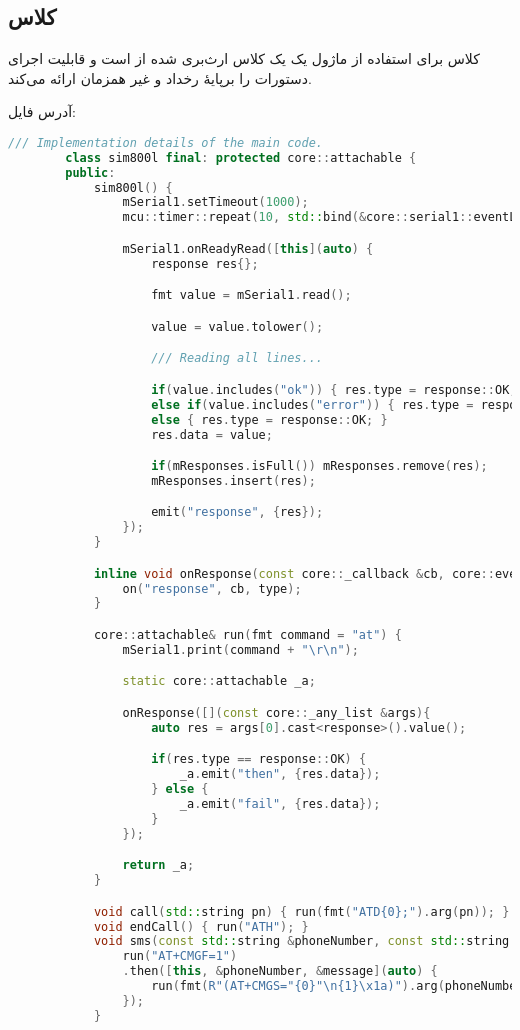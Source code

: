 \subsection{کلاس }
کلاس  برای استفاده از ماژول
یک یک کلاس ارث‌بری شده از  است و قابلیت اجرای دستورات را برپایهٔ رخداد و غیر همزمان ارائه می‌کند.

آدرس فایل:
\hyperref{https://github.com/cardianco/cardian-hardware/blob/master/main/utils/sim800.h}{}{}{}
\begin{latin}
	\small
	\begin{lstlisting}[language=c++, caption={}]
		/// Implementation details of the main code.
		class sim800l final: protected core::attachable {
		public:
			sim800l() {
				mSerial1.setTimeout(1000);
				mcu::timer::repeat(10, std::bind(&core::serial1::eventLoop, &mSerial1));

				mSerial1.onReadyRead([this](auto) {
					response res{};

					fmt value = mSerial1.read();

					value = value.tolower();

					/// Reading all lines...

					if(value.includes("ok")) { res.type = response::OK; }
					else if(value.includes("error")) { res.type = response::ERROR; } else if(value.includes("call ready") || value.includes("sms ready")) { res.type = response::STATUS; }
					else { res.type = response::OK; }
					res.data = value;

					if(mResponses.isFull()) mResponses.remove(res);
					mResponses.insert(res);

					emit("response", {res});
				});
			}

			inline void onResponse(const core::_callback &cb, core::event::Type type = core::event::Once) {
				on("response", cb, type);
			}

			core::attachable& run(fmt command = "at") {
				mSerial1.print(command + "\r\n");

				static core::attachable _a;

				onResponse([](const core::_any_list &args){
					auto res = args[0].cast<response>().value();

					if(res.type == response::OK) {
						_a.emit("then", {res.data});
					} else {
						_a.emit("fail", {res.data});
					}
				});

				return _a;
			}

			void call(std::string pn) { run(fmt("ATD{0};").arg(pn)); }
			void endCall() { run("ATH"); }
			void sms(const std::string &phoneNumber, const std::string &message) {
				run("AT+CMGF=1")
				.then([this, &phoneNumber, &message](auto) {
					run(fmt(R"(AT+CMGS="{0}"\n{1}\x1a)").arg(phoneNumber).arg(message));
				});
			}


\end{lstlisting}
\end{latin}
